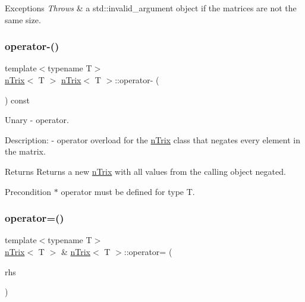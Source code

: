 \begin{DoxyExceptions}{Exceptions}
{\em Throws} & a std\+::invalid\+\_\+argument object if the matrices are not the same size. \\
\hline
\end{DoxyExceptions}
\mbox{\label{classnTrix_a23acc805ad0f69ca5f8195327ebdc3f2}} 
\subsubsection{\texorpdfstring{operator-\/()}{operator-()}\hspace{0.1cm}{\footnotesize\ttfamily [2/2]}}
{\footnotesize\ttfamily template$<$typename T$>$ \\
\hyperlink{classnTrix}{n\+Trix}$<$ T $>$ \hyperlink{classnTrix}{n\+Trix}$<$ T $>$\+::operator-\/ (\begin{DoxyParamCaption}{ }\end{DoxyParamCaption}) const}



Unary -\/ operator. 

Description\+: -\/ operator overload for the \hyperlink{classnTrix}{n\+Trix} class that negates every element in the matrix. \begin{DoxyReturn}{Returns}
Returns a new \hyperlink{classnTrix}{n\+Trix} with all values from the calling object negated. 
\end{DoxyReturn}
\begin{DoxyPrecond}{Precondition}
$\ast$ operator must be defined for type T. 
\end{DoxyPrecond}
\mbox{\label{classnTrix_a9003760685902f4e9f5759f826906641}} 
\subsubsection{\texorpdfstring{operator=()}{operator=()}}
{\footnotesize\ttfamily template$<$typename T$>$ \\
\hyperlink{classnTrix}{n\+Trix}$<$ T $>$ \& \hyperlink{classnTrix}{n\+Trix}$<$ T $>$\+::operator= (\begin{DoxyParamCaption}\item[{const \hyperlink{classnTrix}{n\+Trix}$<$ T $>$ \&}]{rhs }\end{DoxyParamCaption})}




